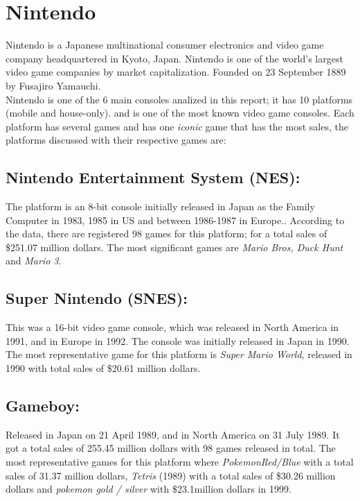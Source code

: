 \section{Nintendo}
Nintendo is a Japanese multinational consumer electronics and video game company
headquartered in Kyoto, Japan. Nintendo is one of the world's largest video
game companies by market capitalization. Founded on 23 September 1889
by Fusajiro Yamauchi\cite{Nintendo}.\\

Nintendo is one of the 6 main consoles analized in this report; it has 10
platforms (mobile and house-only). and is one of the most known
video game consoles. Each platform has several games and has one
\textit{iconic} game that has the most sales, the platforms discussed with
their respective games are:\\

\subsection{Nintendo Entertainment System (NES):} The platform is an 8-bit
console initially released in Japan as the Family Computer in 1983, 1985 in
US and between 1986-1987 in Europe.\cite{Nintendo}. According to the data,
there are registered 98 games for this platform; for a total sales of \$251.07
million dollars. The most significant games are \textit{Mario Bros, Duck Hunt} and
\textit{Mario 3}.\\

\subsection{Super Nintendo (SNES):} This was a 16-bit video game console,
which was released in North America in 1991, and in Europe in 1992. The
console was initially released in Japan in 1990\cite{Nintendo}. The most
representative game for this platform is \textit{Super Mario World}, released in 1990
with total sales of \$20.61 million dollars.\\

\subsection{Gameboy:} Released in Japan on 21 April 1989, and in
North America on 31 July 1989\cite{Nintendo}. It got a total sales of 255.45
million dollars with 98 games released in total. The most representative games
for this platform where \textit{PokemonRed/Blue} with a total sales of 31.37 million
dollars, \textit{Tetris} (1989) with a total sales of \$30.26 million dollars and \textit{pokemon
gold / silver} with \$23.1million dollars in 1999.\\

